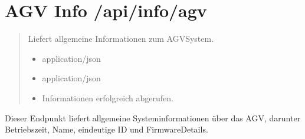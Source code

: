 \documentclass[letterpaper,10pt,english]{sphinxmanual}
\begin{document}
\section{AGV Info \textendash{} /api/info/agv}
\label{\detokenize{agv_rest_api_info:agv-info-api-info-agv}}\label{\detokenize{agv_rest_api_info:get-api-info-agv}}

\begin{fulllineitems}
\label{\detokenize{agv_rest_api_info:get--api-info-agv}}
\pysigstartsignatures
\pysigline
{}
\pysigstopsignatures\begin{quote}\begin{description}
\sphinxAtStartPar
Liefert allgemeine Informationen zum AGV\sphinxhyphen{}System.

\begin{itemize}
\item {} 
\sphinxAtStartPar
{} \textendash{} application/json

\end{itemize}

\begin{itemize}
\item {} 
\sphinxAtStartPar
{} \textendash{} application/json

\end{itemize}

\begin{itemize}
\item {} 
\sphinxAtStartPar
{} \textendash{} Informationen erfolgreich abgerufen.

\end{itemize}

\end{description}\end{quote}

\end{fulllineitems}


\sphinxAtStartPar
{}
Dieser Endpunkt liefert allgemeine Systeminformationen über das AGV,
darunter Betriebszeit, Name, eindeutige ID und Firmware\sphinxhyphen{}Details.
\end{document}
